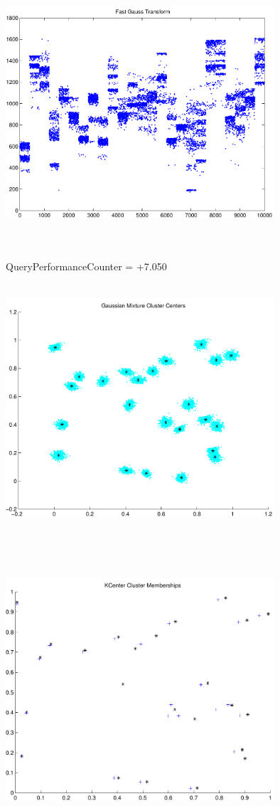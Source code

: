 \documentclass[9pt]{article}
\theoremstyle{plain}
\theoremstyle{definition}
\theoremstyle{remark}
\numberwithin{equation}{section}
\begin{document}
\includegraphics[width=10.0cm,height=10.0cm]{FGT25_Centers.pdf}

QueryPerformanceCounter  =  +7.050
\includegraphics[width=10.0cm,height=10.0cm]{GaussianMixture_ClusterCenters24_Centers.pdf}

\includegraphics[width=10.0cm,height=10.0cm]{KCenterClusterMemberships_24_Centers.pdf}
\end{document}
